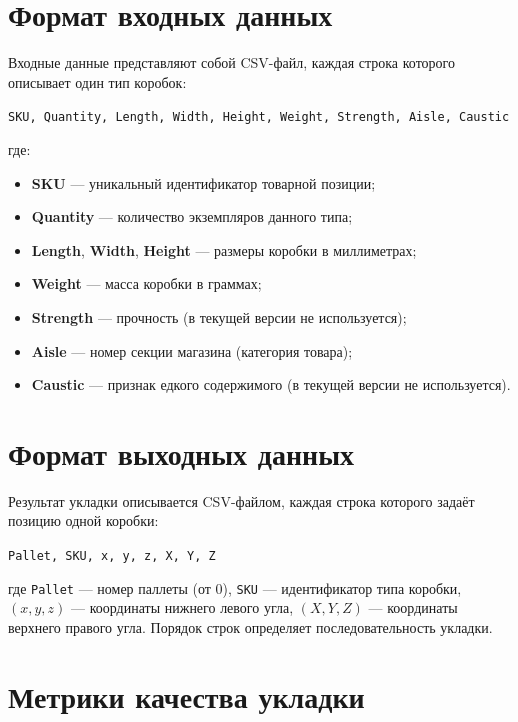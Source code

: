 \section{Формат входных данных}
\label{sec:input_format}

Входные данные представляют собой CSV-файл, каждая строка которого описывает один тип коробок:

\begin{center}
\texttt{SKU, Quantity, Length, Width, Height, Weight, Strength, Aisle, Caustic}
\end{center}

\noindent где:
\begin{itemize}
  \item \textbf{SKU} --- уникальный идентификатор товарной позиции;
  \item \textbf{Quantity} --- количество экземпляров данного типа;
  \item \textbf{Length}, \textbf{Width}, \textbf{Height} --- размеры коробки в миллиметрах;
  \item \textbf{Weight} --- масса коробки в граммах;
  \item \textbf{Strength} --- прочность (в текущей версии не используется);
  \item \textbf{Aisle} --- номер секции магазина (категория товара);
  \item \textbf{Caustic} --- признак едкого содержимого (в текущей версии не используется).
\end{itemize}

\section{Формат выходных данных}
\label{sec:output_format}

Результат укладки описывается CSV-файлом, каждая строка которого задаёт позицию одной коробки:

\begin{center}
\texttt{Pallet, SKU, x, y, z, X, Y, Z}
\end{center}

\noindent где \texttt{Pallet} --- номер паллеты (от 0), \texttt{SKU} --- идентификатор типа коробки, $(x, y, z)$ --- координаты нижнего левого угла, $(X, Y, Z)$ --- координаты верхнего правого угла. Порядок строк определяет последовательность укладки.

\section{Метрики качества укладки}

